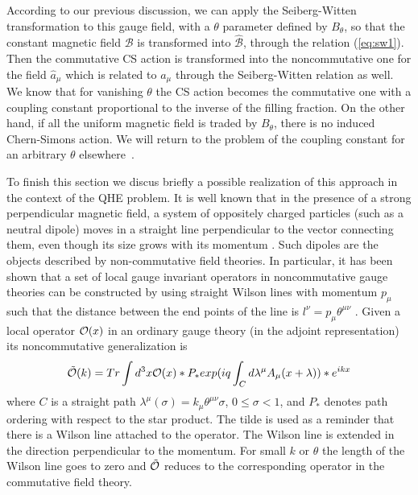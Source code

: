 \documentclass[a4paper,12pt]{article}
\begin{document}
According to our previous discussion, we can apply the
Seiberg-Witten
transformation to this gauge field, with a $\theta$ parameter
defined by
$B_\theta$, so that the constant magnetic field $\mathcal B$ is
transformed
into ${\hat{\mathcal B}}$, through the relation (\ref{eq:sw1}).
Then
the commutative CS action is transformed into the noncommutative
one
\cite{gs} for the field ${\hat a}_\mu$ which is related to $a_\mu$
through
the Seiberg-Witten relation as well. We know that for vanishing
$\theta$
the CS action becomes the commutative one with a coupling constant
proportional to the inverse of the filling fraction. On the other
hand, if all the uniform magnetic field is traded by $B_\theta$,
there is
no induced Chern-Simons action. We will return to the problem of
the
coupling constant for an arbitrary $\theta$ elsewhere~\cite{IP}.


To finish this section we discus briefly a possible realization of
this approach in the context of the QHE problem.  It is well known
that in the presence of a strong perpendicular magnetic field, a
system of oppositely charged particles (such as a neutral dipole)
moves in a straight line perpendicular to the vector connecting
them,
even though its size grows with its momentum \cite{bs}. Such
dipoles
are the objects described by non-commutative field theories. In
particular, it has been shown that a set of local gauge invariant
operators in noncommutative gauge theories can be constructed by
using
straight Wilson lines with momentum $p_\mu$ such that the distance
between the end points of the line is $l^\nu = p_\mu
\theta^{\mu\nu}$
\cite{GHI,IIKK}. Given a local operator ${\cal O}(x)$ in an
ordinary
gauge theory (in the adjoint representation) its noncommutative
generalization is~\cite{GHI}
\begin{equation}
{\tilde{\cal O}}(k) = Tr \int d^3x {\cal O}(x) * P_* exp (iq \int_C
d\lambda^\mu 
A_\mu(x+\lambda) ) * e^{ikx}
\end{equation}
where $C$ is a straight path $\lambda^\mu (\sigma) = k_\mu
\theta^{\mu\nu} \sigma $, $0 \leq \sigma < 1$,
and $P_*$ denotes path ordering with respect to the star product.
The
tilde is used as a reminder that there is a Wilson line attached to
the operator.  The Wilson line is extended in the direction
perpendicular to the momentum. For small $k$ or $\theta$ the length
of the
Wilson line goes to zero and ${\tilde{\cal O}}$ reduces to the
corresponding operator in the commutative field theory.
\end{document}
